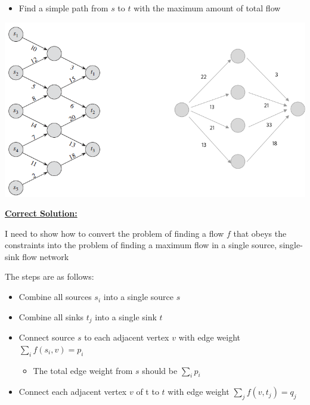 \documentclass[12pt]{article}
\begin{document}
\begin{enumerate}[1.]
\begin{itemize}
        \item Find a simple path from $s$ to $t$ with the maximum amount of total flow
    \end{itemize}

    \begin{center}
    \includegraphics[width=0.9\linewidth]{images/worksheet_5_solution_16.png}
    \end{center}

    \bigskip

    \begin{mdframed}
        \underline{\textbf{Correct Solution:}}


        I need to show how to convert the problem of finding a flow $f$ that obeys the
        constraints into the problem of finding a maximum flow in a single
        source, single-sink flow network

        \bigskip

        The steps are as follows:

        \bigskip

        \begin{itemize}
            \item Combine all sources $s_i$ into a single source $s$
            \item Combine all sinks $t_j$ into a single sink $t$
            \item Connect source $s$ to each adjacent vertex $v$ with edge weight $\sum\limits_{i} f(s_i, v) = p_i$

            \begin{itemize}
                \item The total edge weight from $s$ should be $\sum\limits_{i} p_i$
            \end{itemize}

            \item Connect each adjacent vertex $v$ of t to $t$ with edge weight $\sum\limits_{j} f(v,t_j) = q_j$


\end{itemize}
\end{mdframed}
\end{enumerate}
\end{document}
